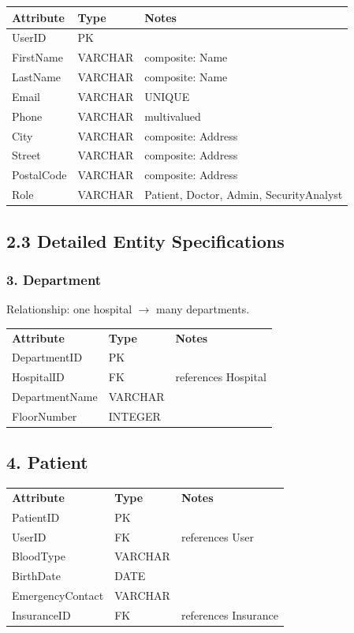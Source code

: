 \begin{tabular}{lll}
\textbf{Attribute} & \textbf{Type} & \textbf{Notes} \\
\hline
UserID & PK & \\
FirstName & VARCHAR & composite: Name \\
LastName & VARCHAR & composite: Name \\
Email & VARCHAR & UNIQUE \\
Phone & VARCHAR & multivalued \\
City & VARCHAR & composite: Address \\
Street & VARCHAR & composite: Address \\
PostalCode & VARCHAR & composite: Address \\
Role & VARCHAR & Patient, Doctor, Admin, SecurityAnalyst \\
\end{tabular}

\subsection*{2.3 Detailed Entity Specifications}

\subsubsection*{3. Department}

Relationship: one hospital $\rightarrow$ many departments.

\begin{tabular}{lll}
\textbf{Attribute} & \textbf{Type} & \textbf{Notes} \\
DepartmentID & PK &  \\
HospitalID & FK & references Hospital \\
DepartmentName & VARCHAR &  \\
FloorNumber & INTEGER &  \\
\end{tabular}

\subsection*{4. Patient}
\begin{tabular}{lll}
\textbf{Attribute} & \textbf{Type} & \textbf{Notes} \\
PatientID & PK &  \\
UserID & FK & references User \\
BloodType & VARCHAR &  \\
BirthDate & DATE &  \\
EmergencyContact & VARCHAR &  \\
InsuranceID & FK & references Insurance \\
\end{tabular}

